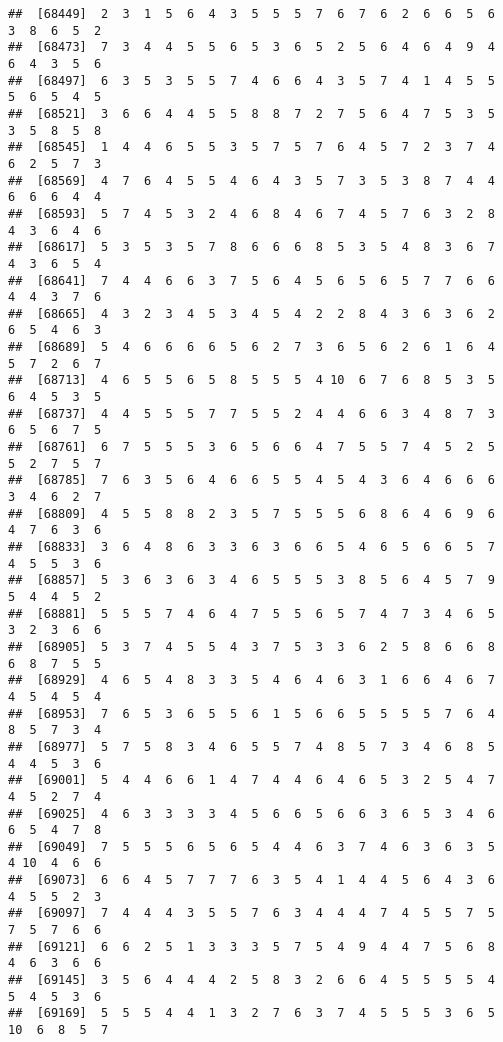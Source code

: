 \documentclass[
]{book}
\begin{document}
\begin{verbatim}
##  [68449]  2  3  1  5  6  4  3  5  5  5  7  6  7  6  2  6  6  5  6  3  8  6  5  2
##  [68473]  7  3  4  4  5  5  6  5  3  6  5  2  5  6  4  6  4  9  4  6  4  3  5  6
##  [68497]  6  3  5  3  5  5  7  4  6  6  4  3  5  7  4  1  4  5  5  5  6  5  4  5
##  [68521]  3  6  6  4  4  5  5  8  8  7  2  7  5  6  4  7  5  3  5  3  5  8  5  8
##  [68545]  1  4  4  6  5  5  3  5  7  5  7  6  4  5  7  2  3  7  4  6  2  5  7  3
##  [68569]  4  7  6  4  5  5  4  6  4  3  5  7  3  5  3  8  7  4  4  6  6  6  4  4
##  [68593]  5  7  4  5  3  2  4  6  8  4  6  7  4  5  7  6  3  2  8  4  3  6  4  6
##  [68617]  5  3  5  3  5  7  8  6  6  6  8  5  3  5  4  8  3  6  7  4  3  6  5  4
##  [68641]  7  4  4  6  6  3  7  5  6  4  5  6  5  6  5  7  7  6  6  4  4  3  7  6
##  [68665]  4  3  2  3  4  5  3  4  5  4  2  2  8  4  3  6  3  6  2  6  5  4  6  3
##  [68689]  5  4  6  6  6  6  5  6  2  7  3  6  5  6  2  6  1  6  4  5  7  2  6  7
##  [68713]  4  6  5  5  6  5  8  5  5  5  4 10  6  7  6  8  5  3  5  6  4  5  3  5
##  [68737]  4  4  5  5  5  7  7  5  5  2  4  4  6  6  3  4  8  7  3  6  5  6  7  5
##  [68761]  6  7  5  5  5  3  6  5  6  6  4  7  5  5  7  4  5  2  5  5  2  7  5  7
##  [68785]  7  6  3  5  6  4  6  6  5  5  4  5  4  3  6  4  6  6  6  3  4  6  2  7
##  [68809]  4  5  5  8  8  2  3  5  7  5  5  5  6  8  6  4  6  9  6  4  7  6  3  6
##  [68833]  3  6  4  8  6  3  3  6  3  6  6  5  4  6  5  6  6  5  7  4  5  5  3  6
##  [68857]  5  3  6  3  6  3  4  6  5  5  5  3  8  5  6  4  5  7  9  5  4  4  5  2
##  [68881]  5  5  5  7  4  6  4  7  5  5  6  5  7  4  7  3  4  6  5  3  2  3  6  6
##  [68905]  5  3  7  4  5  5  4  3  7  5  3  3  6  2  5  8  6  6  8  6  8  7  5  5
##  [68929]  4  6  5  4  8  3  3  5  4  6  4  6  3  1  6  6  4  6  7  4  5  4  5  4
##  [68953]  7  6  5  3  6  5  5  6  1  5  6  6  5  5  5  5  7  6  4  8  5  7  3  4
##  [68977]  5  7  5  8  3  4  6  5  5  7  4  8  5  7  3  4  6  8  5  4  4  5  3  6
##  [69001]  5  4  4  6  6  1  4  7  4  4  6  4  6  5  3  2  5  4  7  4  5  2  7  4
##  [69025]  4  6  3  3  3  3  4  5  6  6  5  6  6  3  6  5  3  4  6  6  5  4  7  8
##  [69049]  7  5  5  5  6  5  6  5  4  4  6  3  7  4  6  3  6  3  5  4 10  4  6  6
##  [69073]  6  6  4  5  7  7  7  6  3  5  4  1  4  4  5  6  4  3  6  4  5  5  2  3
##  [69097]  7  4  4  4  3  5  5  7  6  3  4  4  4  7  4  5  5  7  5  7  5  7  6  6
##  [69121]  6  6  2  5  1  3  3  3  5  7  5  4  9  4  4  7  5  6  8  4  6  3  6  6
##  [69145]  3  5  6  4  4  4  2  5  8  3  2  6  6  4  5  5  5  5  4  5  4  5  3  6
##  [69169]  5  5  5  4  4  1  3  2  7  6  3  7  4  5  5  5  3  6  5 10  6  8  5  7

\end{verbatim}
\end{document}
